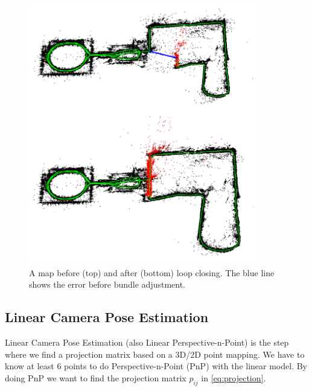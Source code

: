 \documentclass[11pt,a4paper,titlepage,oneside]{report}
\begin{document}
\begin{figure}[H]
  \begin{center}
		\includegraphics[width=0.9\textwidth]{img/loop_closing.jpg}
  \end{center}
	\caption{A map before (top) and after (bottom) loop closing. The blue line shows the error before bundle adjustment.}\label{fig:loop_closing}
\end{figure}

\subsection{Linear Camera Pose Estimation}\label{sec:pnp}

Linear Camera Pose Estimation (also Linear Perspective-n-Point) is the step where we find a projection matrix based on a 3D/2D point mapping. We have to know at least 6 points to do Perspective-n-Point (PnP) with the linear model. By doing PnP we want to find the projection matrix $p_{ij}$ in \ref{eq:projection}.
\end{document}
